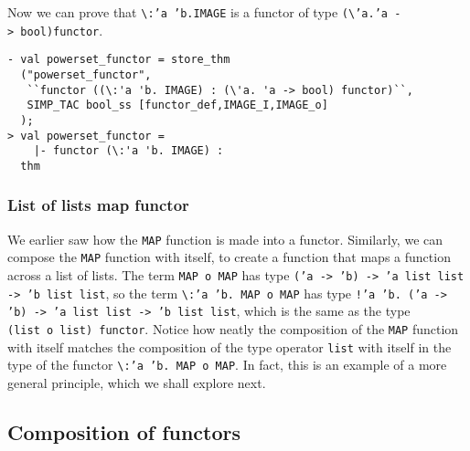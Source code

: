 \noindent
Now we can prove that \verb|\|{\tt {:}'a~'b.IMAGE} is a functor
of type {\tt (}\verb|\|{\tt 'a.'a~->~bool)functor}.
%
\begin{session}
\begin{verbatim}
- val powerset_functor = store_thm
  ("powerset_functor",
   ``functor ((\:'a 'b. IMAGE) : (\'a. 'a -> bool) functor)``,
   SIMP_TAC bool_ss [functor_def,IMAGE_I,IMAGE_o]
  );
> val powerset_functor =
    |- functor (\:'a 'b. IMAGE) :
  thm
\end{verbatim}
\end{session}

\subsubsection{List of lists map functor}

We earlier saw how the \texttt{MAP} function is made into a functor.
Similarly, we can compose the \texttt{MAP} function with itself, to create a function
that maps a function across a list of lists.  The term \texttt{MAP~o~MAP} has type
\texttt{('a -> 'b) -> 'a~list~list -> 'b~list~list}, so
the term
\verb|\|\texttt{:'a~'b.~MAP o MAP} has type
\texttt{!'a~'b.~('a -> 'b) -> 'a~list~list -> 'b~list~list}, which is the same
as the type \texttt{(list~o~list)~functor}. Notice how neatly the composition
of the \texttt{MAP} function with itself matches the composition of the type operator
\texttt{list} with itself in the type of the functor \verb|\|\texttt{:'a~'b.~MAP~o~MAP}.
In fact, this is an example of a more general principle, which we shall explore next.

\subsection{Composition of functors}

